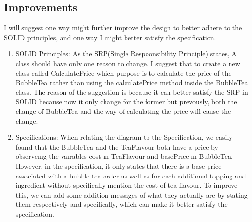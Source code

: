 \documentclass[12pt]{article}
\begin{document}
\subsection{Improvements}
I will suggest one way might further improve the design to better adhere to the SOLID principles, and one way I might better satisfy the specification.

\begin{enumerate}
    \item SOLID Principles: As the SRP(Single Respoonsibility Principle) states, A class should have only one reason to change. 
    I suggest that to create a new class called CalculatePrice which purpose is to calculate the price of the BubbleTea rather than using the calculatePrice method inside the BubbleTea class. 
    The reason of the suggestion is because it can better satisfy the SRP in SOLID because now it only change for the former but prevously, both the change of BubbleTea and the way of calculating the price will cause the change.
    \item Specifications: When relating the diagram to the Specification, we easily found that the BubbleTea and the TeaFlavour both have a price by observeing the vairables cost in TeaFlavour and basePrice in BubbleTea. 
    However, in the specification, it only states that there is a base price associated with a bubble tea order as well as for each additional topping and ingredient without specifically mention the cost of tea flavour.
    To improve this, we can add some addition messages of what they actually are by stating them respectively and specifically, which can make it better satisfy the specification.
\end{enumerate}
\end{document}
